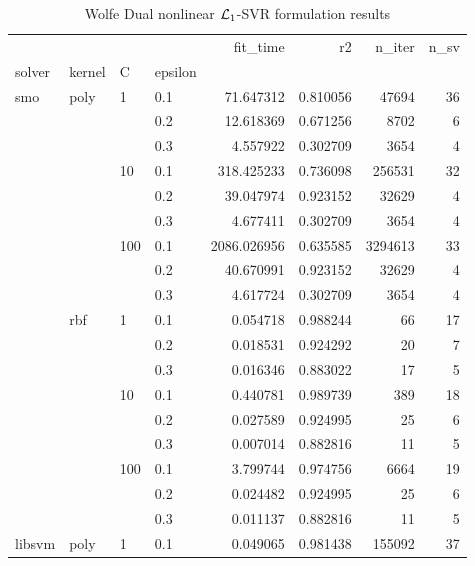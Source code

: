 \begin{table}[H]
\centering
\caption{Wolfe Dual nonlinear $\protect \mathcal{L}_1$-SVR formulation results}
\label{nonlinear_dual_l1_svr_cv_results}
\begin{tabular}{llllrrrr}
\toprule
       &     &     &     &     fit\_time &        r2 &    n\_iter &  n\_sv \\
solver & kernel & C & epsilon &              &           &           &       \\
\midrule
smo & poly & 1   & 0.1 &    71.647312 &  0.810056 &     47694 &    36 \\
       &     &     & 0.2 &    12.618369 &  0.671256 &      8702 &     6 \\
       &     &     & 0.3 &     4.557922 &  0.302709 &      3654 &     4 \\
       &     & 10  & 0.1 &   318.425233 &  0.736098 &    256531 &    32 \\
       &     &     & 0.2 &    39.047974 &  0.923152 &     32629 &     4 \\
       &     &     & 0.3 &     4.677411 &  0.302709 &      3654 &     4 \\
       &     & 100 & 0.1 &  2086.026956 &  0.635585 &   3294613 &    33 \\
       &     &     & 0.2 &    40.670991 &  0.923152 &     32629 &     4 \\
       &     &     & 0.3 &     4.617724 &  0.302709 &      3654 &     4 \\
       & rbf & 1   & 0.1 &     0.054718 &  0.988244 &        66 &    17 \\
       &     &     & 0.2 &     0.018531 &  0.924292 &        20 &     7 \\
       &     &     & 0.3 &     0.016346 &  0.883022 &        17 &     5 \\
       &     & 10  & 0.1 &     0.440781 &  0.989739 &       389 &    18 \\
       &     &     & 0.2 &     0.027589 &  0.924995 &        25 &     6 \\
       &     &     & 0.3 &     0.007014 &  0.882816 &        11 &     5 \\
       &     & 100 & 0.1 &     3.799744 &  0.974756 &      6664 &    19 \\
       &     &     & 0.2 &     0.024482 &  0.924995 &        25 &     6 \\
       &     &     & 0.3 &     0.011137 &  0.882816 &        11 &     5 \\
libsvm & poly & 1   & 0.1 &     0.049065 &  0.981438 &    155092 &    37 \\

\end{tabular}
\end{table}
